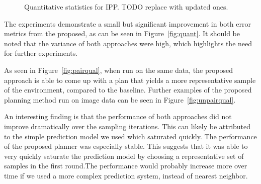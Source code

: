 \begin{figure}[h]
    \hfill
    \hfill
    \caption{Quantitative statistics for IPP. TODO replace with updated ones.}
    \label{fig:res_ipp_quant}
\end{figure}

The experiments demonstrate a small but significant improvement in both error metrics from the proposed, as can be seen in Figure~\ref{fig:quant}. It should be noted that the variance of both approaches were high, which highlights the need for further experiments.

As seen in Figure~\ref{fig:pairqual}, when run on the same data, the proposed approach is able to come up with a plan that yields a more representative sample of the environment, compared to the baseline. Further examples of the proposed planning method run on image data can be seen in Figure~\ref{fig:unpairqual}. 

An interesting finding is that the performance of both approaches did not improve dramatically over the sampling iterations. This can likely be attributed to the simple prediction model we used which saturated quickly. The performance of the proposed planner was especially stable. This suggests that it was able to very quickly saturate the prediction model by choosing a representative set of samples in the first round.The performance would probably increase more over time if we used a more complex prediction system, instead of nearest neighbor. 

